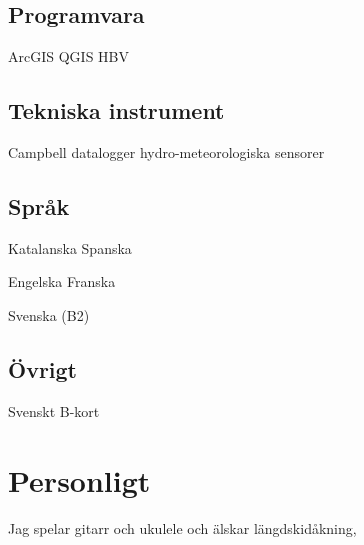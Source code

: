 \documentclass[]{gironslopez-resume-se}
\begin{document}
\begin{minipage}[t]{0.33\textwidth}
    \subsection{Programvara}
    ArcGIS \textbullet{} QGIS \textbullet{} HBV

    \sectionsep
    
    \subsection{Tekniska instrument}
    Campbell datalogger \textbullet{} hydro-meteorologiska sensorer
    
    \sectionsep

    \subsection{Språk}
    Katalanska \textbullet{} Spanska

    Engelska \textbullet{} Franska

    Svenska (B2)

    \sectionsep
    
    \subsection{Övrigt}
    Svenskt B-kort

    \section{Personligt}
	Jag spelar gitarr och ukulele och älskar längdskidåkning,

  \end{minipage}
  \hfill
\end{document}
